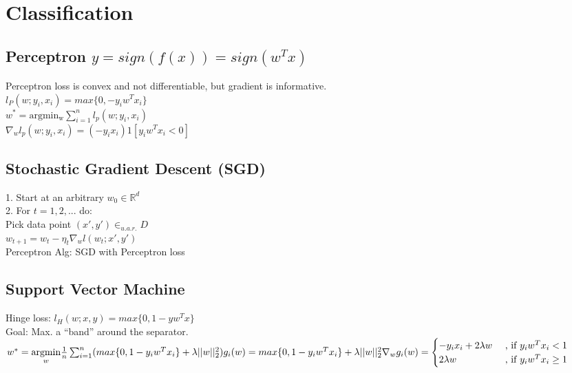 \section*{Classification}

\subsection*{Perceptron $y=sign(f(x))=sign(w^Tx)$}
Perceptron loss is convex and not differentiable, but gradient is informative.\\
$l_{P} (w;y_i,x_i) = max\{0, -y_i w^T x_i \}$\\
$w^* = \operatorname{argmin_w} \sum_{i=1}^n l_p (w;y_i,x_i)$\\
$\nabla_w l_p(w;y_i,x_i) = (-y_ix_i)1[y_iw^Tx_i<0]$

\subsection*{Stochastic Gradient Descent (SGD)}
1. Start at an arbitrary $w_0 \in \mathbb{R}^d$\\
2. For $t = 1, 2,  ...$ do: \\
	Pick data point $(x',y') \in_{u.a.r.} D$\\
	$w_{t+1} = w_t - \eta_t \nabla_w l(w_t;x',y')$\\
Perceptron Alg: SGD with Perceptron loss



\subsection*{Support Vector Machine}
Hinge loss: $l_H(w;x,y) = max \{0,1-y w^T x\}$\\
Goal: Max. a ``band'' around the separator.\\
$w^* = \underset{w}{\operatorname{argmin}} \frac{1}{n}\sum_{i=1}^n  (max \{0,1-y_i w^T x_i\} + \lambda ||w||_2^2)\\
g_i(w) = max \{0,1-y_i w^T x_i\} + \lambda ||w||_2^2\\
\nabla_w g_i(w) = \begin{cases}
    -y_i x_i + 2\lambda w &\text{ , if $y_i w^T x_i<1$}\\
		2\lambda w &\text{ , if $y_i w^T x_i \geq 1$}
\end{cases}$

